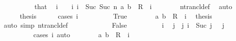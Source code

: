 \begin{isabellebody}
\ \ \isamarkupfalse%
\ {\isacharminus}{\kern0pt}\isanewline
\ \ \ \ \isamarkupfalse%
\ that\ \isamarkupfalse%
\ i\ \ {\isachardoublequoteopen}{}\ {\isacharless}{\kern0pt}\ i{\isachardoublequoteclose}\ {\isachardoublequoteopen}i\ {\isasymle}\ Suc\ {\isacharparenleft}{\kern0pt}Suc\ n{\isacharparenright}{\kern0pt}{\isachardoublequoteclose}\ {\isachardoublequoteopen}{\isacharparenleft}{\kern0pt}a{\isacharcomma}{\kern0pt}\ b{\isacharparenright}{\kern0pt}\ {\isasymin}\ R\ {\isacharcircum}{\kern0pt}{\isacharcircum}{\kern0pt}\ i{\isachardoublequoteclose}\isanewline
\ \ \ \ \ \ \isamarkupfalse%
\ ntrancl{\isacharunderscore}{\kern0pt}def\ \isamarkupfalse%
\ auto\isanewline
\ \ \ \ \isamarkupfalse%
\ {\isacharquery}{\kern0pt}thesis\isanewline
\ \ \ \ \isamarkupfalse%
\ {\isacharparenleft}{\kern0pt}cases\ {\isachardoublequoteopen}i\ {\isacharequal}{\kern0pt}\ {}{\isachardoublequoteclose}{\isacharparenright}{\kern0pt}\isanewline
\ \ \ \ \ \ \isamarkupfalse%
\ True\isanewline
\ \ \ \ \ \ \isamarkupfalse%
\ {\isacartoucheopen}{\isacharparenleft}{\kern0pt}a{\isacharcomma}{\kern0pt}\ b{\isacharparenright}{\kern0pt}\ {\isasymin}\ R\ {\isacharcircum}{\kern0pt}{\isacharcircum}{\kern0pt}\ i{\isacartoucheclose}\ \isamarkupfalse%
\ {\isacharquery}{\kern0pt}thesis\isanewline
\ \ \ \ \ \ \ \ \isamarkupfalse%
\ {\isacharparenleft}{\kern0pt}auto\ simp{\isacharcolon}{\kern0pt}\ ntrancl{\isacharunderscore}{\kern0pt}def{\isacharparenright}{\kern0pt}\isanewline
\ \ \ \ \isamarkupfalse%
\isanewline
\ \ \ \ \ \ \isamarkupfalse%
\ False\isanewline
\ \ \ \ \ \ \isamarkupfalse%
\ {\isacartoucheopen}{}\ {\isacharless}{\kern0pt}\ i{\isacartoucheclose}\ \isamarkupfalse%
\ j\ \ j{\isacharcolon}{\kern0pt}\ {\isachardoublequoteopen}i\ {\isacharequal}{\kern0pt}\ Suc\ j{\isachardoublequoteclose}\ {\isachardoublequoteopen}{}\ {\isacharless}{\kern0pt}\ j{\isachardoublequoteclose}\isanewline
\ \ \ \ \ \ \ \ \isamarkupfalse%
\ {\isacharparenleft}{\kern0pt}cases\ i{\isacharparenright}{\kern0pt}\ auto\isanewline
\ \ \ \ \ \ \isamarkupfalse%
\ {\isacartoucheopen}{\isacharparenleft}{\kern0pt}a{\isacharcomma}{\kern0pt}\ b{\isacharparenright}{\kern0pt}\ {\isasymin}\ R\ {\isacharcircum}{\kern0pt}{\isacharcircum}{\kern0pt}\ i{\isacartoucheclose}\ \isamarkupfalse%

\end{isabellebody}

